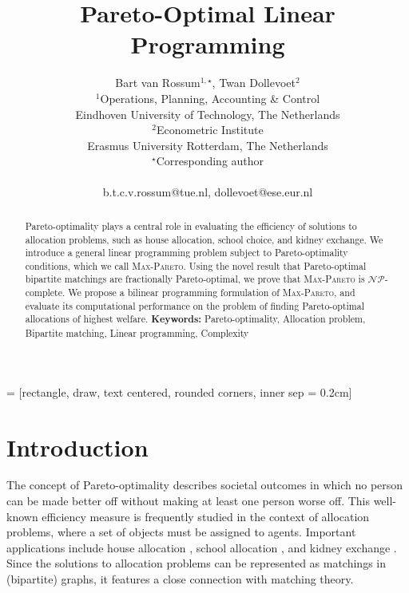 \documentclass[a4paper, 11pt]{article}
\title{Pareto-Optimal Linear Programming}
\author{Bart van Rossum$^{1,\star}$, Twan Dollevoet$^{2}$
\vspace{0.1cm}\\
\small{$^1$Operations, Planning, Accounting \& Control}\\ 
\small{Eindhoven University of Technology, The Netherlands}
\vspace{0.1cm}\\
\small{$^2$Econometric Institute}\\ 
\small{Erasmus University Rotterdam, The Netherlands}
\vspace{0.1cm}\\
\small{$^\star$Corresponding author} \\
\vspace{0.1cm} \\
\small{b.t.c.v.rossum@tue.nl, dollevoet@ese.eur.nl}
}
\date{}
\begin{document}

 = [rectangle, draw, 
 text centered, rounded corners, inner sep = 0.2cm]

  
\maketitle

\begin{abstract}
\noindent 
Pareto-optimality plays a central role in evaluating the efficiency of solutions to allocation problems, such as house allocation, school choice, and kidney exchange. We introduce a general linear programming problem subject to Pareto-optimality conditions, which we call \textsc{Max-Pareto}. Using the novel result that Pareto-optimal bipartite matchings are fractionally Pareto-optimal, we prove that \textsc{Max-Pareto} is $\mathcal{NP}$-complete. We propose a bilinear programming formulation of \textsc{Max-Pareto}, and evaluate its computational performance on the problem of finding Pareto-optimal allocations of highest welfare. 
\vspace{5mm}
\newline
{\bf Keywords:} Pareto-optimality, Allocation problem, Bipartite matching, Linear programming, Complexity
\end{abstract}

\section{Introduction}
\label{sec:intro}

The concept of Pareto-optimality describes societal outcomes in which no person can be made better off without making at least one person worse off. This well-known efficiency measure is frequently studied in the context of allocation problems, where a set of objects must be assigned to agents. Important applications include house allocation \citep{abraham2004pareto}, school allocation \citep{abdulkadirouglu2003school}, and kidney exchange \citep{sonmez2014altruistically}. Since the solutions to allocation problems can be represented as matchings in (bipartite) graphs, it features a close connection with matching theory.
\end{document}
